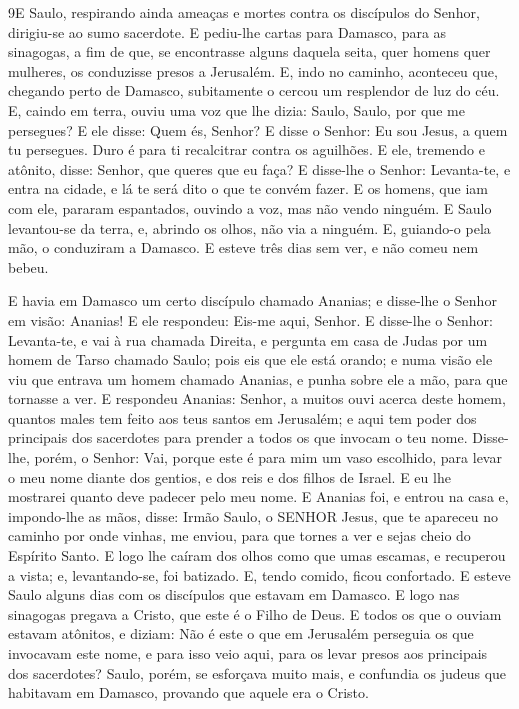 \medskip

\lettrine{9} E Saulo, respirando ainda ameaças e mortes contra
os discípulos do Senhor, dirigiu-se ao sumo sacerdote. E
pediu-lhe cartas para Damasco, para as sinagogas, a fim de que, se
encontrasse alguns daquela seita, quer homens quer mulheres, os
conduzisse presos a Jerusalém. E, indo no caminho, aconteceu
que, chegando perto de Damasco, subitamente o cercou um resplendor
de luz do céu. E, caindo em terra, ouviu uma voz que lhe dizia:
Saulo, Saulo, por que me persegues? E ele disse: Quem és,
Senhor? E disse o Senhor: Eu sou Jesus, a quem tu persegues. Duro é
para ti recalcitrar contra os aguilhões. E ele, tremendo e
atônito, disse: Senhor, que queres que eu faça? E disse-lhe o
Senhor: Levanta-te, e entra na cidade, e lá te será dito o que te
convém fazer. E os homens, que iam com ele, pararam espantados,
ouvindo a voz, mas não vendo ninguém. E Saulo levantou-se da
terra, e, abrindo os olhos, não via a ninguém. E, guiando-o pela
mão, o conduziram a Damasco. E esteve três dias sem ver, e não
comeu nem bebeu.

E havia em Damasco um certo discípulo chamado Ananias; e
disse-lhe o Senhor em visão: Ananias! E ele respondeu: Eis-me aqui,
Senhor. E disse-lhe o Senhor: Levanta-te, e vai à rua chamada
Direita, e pergunta em casa de Judas por um homem de Tarso chamado
Saulo; pois eis que ele está orando; e numa visão ele viu que
entrava um homem chamado Ananias, e punha sobre ele a mão, para que
tornasse a ver. E respondeu Ananias: Senhor, a muitos ouvi
acerca deste homem, quantos males tem feito aos teus santos em
Jerusalém; e aqui tem poder dos principais dos sacerdotes
para prender a todos os que invocam o teu nome. Disse-lhe,
porém, o Senhor: Vai, porque este é para mim um vaso escolhido, para
levar o meu nome diante dos gentios, e dos reis e dos filhos de
Israel. E eu lhe mostrarei quanto deve padecer pelo meu nome.
E Ananias foi, e entrou na casa e, impondo-lhe as mãos,
disse: Irmão Saulo, o SENHOR Jesus, que te apareceu no caminho por
onde vinhas, me enviou, para que tornes a ver e sejas cheio do
Espírito Santo. E logo lhe caíram dos olhos como que umas
escamas, e recuperou a vista; e, levantando-se, foi batizado.
E, tendo comido, ficou confortado. E esteve Saulo alguns dias
com os discípulos que estavam em Damasco. E logo nas
sinagogas pregava a Cristo, que este é o Filho de Deus. E
todos os que o ouviam estavam atônitos, e diziam: Não é este o que
em Jerusalém perseguia os que invocavam este nome, e para isso veio
aqui, para os levar presos aos principais dos sacerdotes?
Saulo, porém, se esforçava muito mais, e confundia os judeus
que habitavam em Damasco, provando que aquele era o Cristo.

